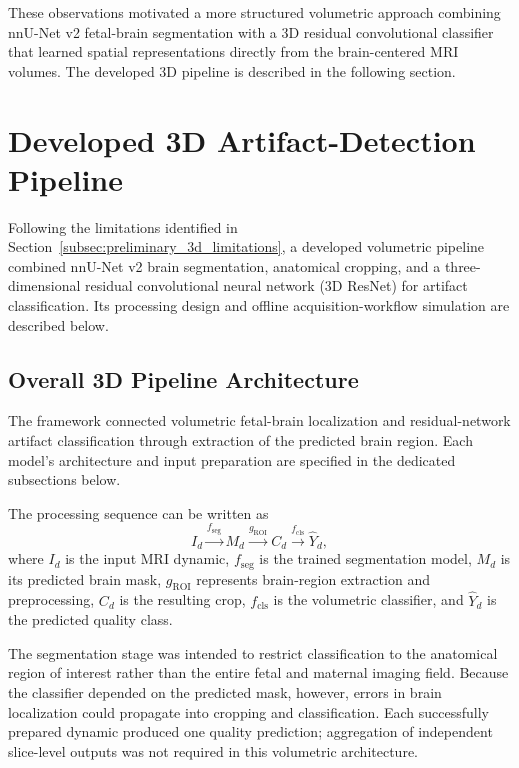 These observations motivated a more structured volumetric approach combining nnU-Net v2 fetal-brain segmentation with a 3D residual convolutional classifier that learned spatial representations directly from the brain-centered MRI volumes. The developed 3D pipeline is described in the following section.

\section{Developed 3D Artifact-Detection Pipeline}
\label{sec:developed_3d_pipeline}

Following the limitations identified in Section~\ref{subsec:preliminary_3d_limitations}, a developed volumetric pipeline combined nnU-Net v2 brain segmentation, anatomical cropping, and a three-dimensional residual convolutional neural network (3D ResNet) for artifact classification. Its processing design and offline acquisition-workflow simulation are described below.

\subsection{Overall 3D Pipeline Architecture}
\label{subsec:overall_3d_pipeline}

The framework connected volumetric fetal-brain localization and residual-network artifact classification through extraction of the predicted brain region. Each model's architecture and input preparation are specified in the dedicated subsections below.

The processing sequence can be written as
\begin{equation}
I_d \xrightarrow{f_{\mathrm{seg}}} M_d
\xrightarrow{g_{\mathrm{ROI}}} C_d
\xrightarrow{f_{\mathrm{cls}}} \hat{Y}_d,
\end{equation}
where $I_d$ is the input MRI dynamic, $f_{\mathrm{seg}}$ is the trained segmentation model, $M_d$ is its predicted brain mask, $g_{\mathrm{ROI}}$ represents brain-region extraction and preprocessing, $C_d$ is the resulting crop, $f_{\mathrm{cls}}$ is the volumetric classifier, and $\hat{Y}_d$ is the predicted quality class.

The segmentation stage was intended to restrict classification to the anatomical region of interest rather than the entire fetal and maternal imaging field. Because the classifier depended on the predicted mask, however, errors in brain localization could propagate into cropping and classification. Each successfully prepared dynamic produced one quality prediction; aggregation of independent slice-level outputs was not required in this volumetric architecture.

